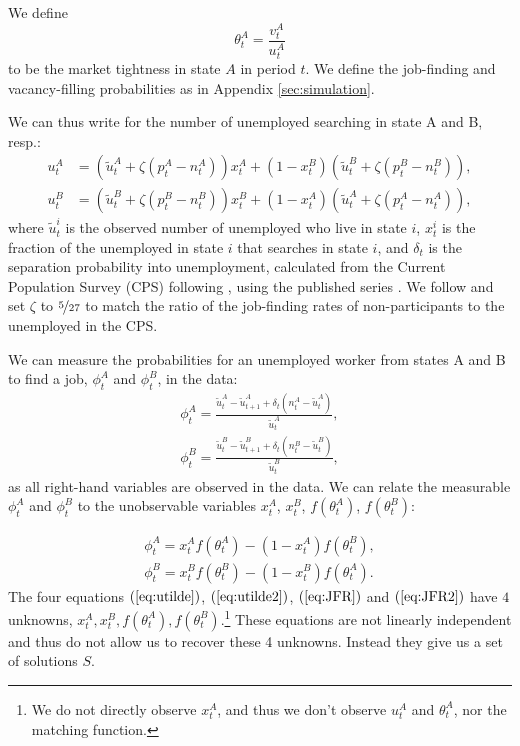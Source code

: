 \documentclass[12pt]{article}
\newcommand{\1}{\mathbf{1}}
\newcommand{\vat}{v^A_t}
\newcommand{\xat}{x^A_t}
\newcommand{\xbt}{x^B_t}
\newcommand{\tat}{\theta^A_t}
\newcommand{\tbt}{\theta^B_t}
\newcommand{\uat}{u^A_t}
\newcommand{\ubt}{u^B_t}
\newcommand{\uatt}{\tilde{u}^A_t}
\newcommand{\ubtt}{\tilde{u}^B_t}
\newcommand{\uattp}{\tilde{u}^A_{t+1}}
\newcommand{\ubttp}{\tilde{u}^B_{t+1}}
\newcommand{\nat}{n^A_t}
\newcommand{\nbt}{n^B_t}
\newcommand{\pat}{p^A_t}
\newcommand{\pbt}{p^B_t}
\begin{document}
\begin{appendix}
We define
\begin{equation*}
\tat = \frac{\vat}{\uat}
\end{equation*}
to be the market tightness in state $A$ in period $t$.  We define the job-finding and vacancy-filling probabilities as in Appendix \ref{sec:simulation}.






We can thus write for the number of unemployed searching in state A and B, resp.:
\begin{align} \label{eq:utilde}
\uat&=(\uatt+\zeta(\pat-\nat))\xat+(1-\xbt)(\ubtt+\zeta(\pbt-\nbt)),\\
\ubt&=(\ubtt+\zeta(\pbt-\nbt))\xbt+(1-\xat)(\uatt+\zeta(\pat-\nat)), \label{eq:utilde2}
\end{align}
where $\tilde{u}^{i}_{t}$ is the observed number of unemployed who live in state $i$, $x^{i}_{t}$ is the fraction of the unemployed in state $i$ that searches in state $i$, and $\delta_t$ is the separation probability into unemployment, calculated from the Current Population Survey (CPS) following \citet{shimer:05b}, using the published series \citep{data:shimer-flows}.  We follow \citet{hall:13} and set $\zeta$ to $\nicefrac{5}{27}$ to match the ratio of the job-finding rates of non-participants to the unemployed in the CPS.




We can measure the probabilities for an unemployed worker from states A and B to find a job, $\phi_t^A$ and $\phi_t^B$, in the data:
\begin{align} \label{eq:JFR_Data}
\phi_t^A = \frac{\uatt-\uattp+\delta_t \left(\nat-\uatt\right)}{\uatt} ,\\
\phi_t^B = \frac{\ubtt-\ubttp + \delta_t \left(\nbt-\ubtt\right) }{\ubtt},
\end{align}
as all right-hand variables are observed in the data.
We can relate the measurable $\phi_t^A$ and $\phi_t^B$ to the unobservable variables $\xat$, $\xbt$, $f(\tat)$, $f(\tbt)$:

\begin{align} \label{eq:JFR}
\phi_t^A = \xat f\left(\tat\right)-\left(1-\xat\right) f\left(\tbt\right),\\
\phi_t^B = \xbt f\left(\tbt\right)-\left(1-\xbt\right) f\left(\tat\right).\label{eq:JFR2}
\end{align}
The four equations $(\ref{eq:utilde})$, $(\ref{eq:utilde2})$, $(\ref{eq:JFR})$ and $(\ref{eq:JFR2})$ have $4$ unknowns, $\xat, \xbt, f(\tat), f(\tbt)$.\footnote{We do not directly observe $\xat$, and thus we don't observe $\uat$ and $\tat$, nor the matching function.} These equations are not linearly independent and thus do not allow us to recover these 4 unknowns. Instead they give us a set of solutions $S$.


\end{appendix}
\end{document}
